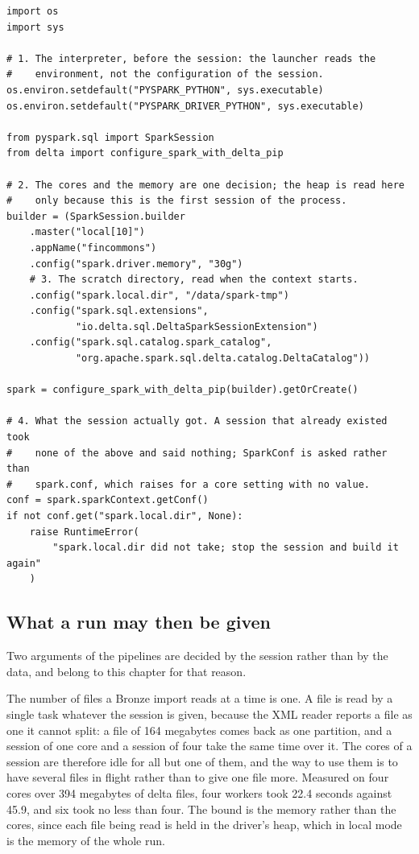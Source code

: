 \begin{verbatim}
import os
import sys

# 1. The interpreter, before the session: the launcher reads the
#    environment, not the configuration of the session.
os.environ.setdefault("PYSPARK_PYTHON", sys.executable)
os.environ.setdefault("PYSPARK_DRIVER_PYTHON", sys.executable)

from pyspark.sql import SparkSession
from delta import configure_spark_with_delta_pip

# 2. The cores and the memory are one decision; the heap is read here
#    only because this is the first session of the process.
builder = (SparkSession.builder
    .master("local[10]")
    .appName("fincommons")
    .config("spark.driver.memory", "30g")
    # 3. The scratch directory, read when the context starts.
    .config("spark.local.dir", "/data/spark-tmp")
    .config("spark.sql.extensions",
            "io.delta.sql.DeltaSparkSessionExtension")
    .config("spark.sql.catalog.spark_catalog",
            "org.apache.spark.sql.delta.catalog.DeltaCatalog"))

spark = configure_spark_with_delta_pip(builder).getOrCreate()

# 4. What the session actually got. A session that already existed took
#    none of the above and said nothing; SparkConf is asked rather than
#    spark.conf, which raises for a core setting with no value.
conf = spark.sparkContext.getConf()
if not conf.get("spark.local.dir", None):
    raise RuntimeError(
        "spark.local.dir did not take; stop the session and build it again"
    )
\end{verbatim}

\subsection{What a run may then be given\label{sec:infra-given}}

Two arguments of the pipelines are decided by the session rather than by the data, and belong to this chapter for that reason.

The number of files a Bronze import reads at a time is one. A file is read by a single task whatever the session is given, because the XML reader reports a file as one it cannot split: a file of 164 megabytes comes back as one partition, and a session of one core and a session of four take the same time over it. The cores of a session are therefore idle for all but one of them, and the way to use them is to have several files in flight rather than to give one file more. Measured on four cores over 394 megabytes of delta files, four workers took 22.4 seconds against 45.9, and six took no less than four. The bound is the memory rather than the cores, since each file being read is held in the driver's heap, which in local mode is the memory of the whole run.

